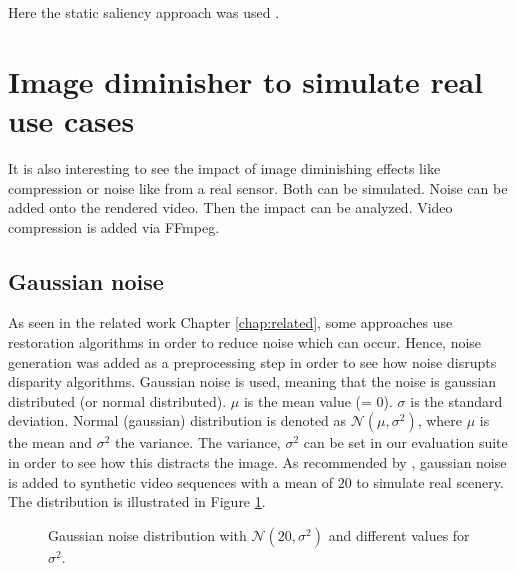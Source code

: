 \noindent Here the static saliency approach was used \citep{hou2007saliency}.


\section{Image diminisher to simulate real use cases}

It is also interesting to see the impact of image diminishing effects like compression or noise like from a real sensor.
Both can be simulated.
Noise can be added onto the rendered video.
Then the impact can be analyzed.
Video compression is added via FFmpeg.


\subsection*{Gaussian noise}

As seen in the related work Chapter \ref{chap:related}, some approaches use restoration algorithms in order to reduce noise which can occur.
Hence, noise generation was added as a preprocessing step in order to see how noise disrupts disparity algorithms.
Gaussian noise is used, meaning that the noise is gaussian distributed (or normal distributed).
\newline\newline\noindent $\mu$ is the mean value (= 0).
$\sigma$ is the standard deviation.
Normal (gaussian) distribution is denoted as $\mathcal{N}(\mu,\sigma^2)$, where $\mu$ is the mean and $\sigma^2$ the variance.
\newline\newline\noindent The variance, $\sigma^2$ can be set in our evaluation suite in order to see how this distracts the image.
As recommended by \citep{richardt2010real}, gaussian noise is added to synthetic video sequences with a mean of $20$ to simulate real scenery.
The distribution is illustrated in Figure \ref{fig:gaussian}.

\begin{figure}[h!]
  \center
  \label{fig:gaussian}
  \caption{Gaussian noise distribution with $\mathcal{N}(20,\sigma^2)$ and different values for $\sigma^2$.}
\end{figure}

